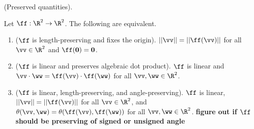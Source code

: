 \begin{theorem}
\label{ch::lin_alg::lemma::orthogonal_linear_fns_preserve_alg_dot_product}
    (Preserved quantities).

    Let $\ff:\R^2 \rightarrow \R^2$. The following are equivalent.

    \begin{enumerate}
        \item ($\ff$ is length-preserving and fixes the origin). $||\vv|| = ||\ff(\vv)||$ for all $\vv \in \R^2$ and $\ff(\mathbf{0}) = \mathbf{0}$.
        \item ($\ff$ is linear and preserves algebraic dot product). $\ff$ is linear and $\vv \cdot \ww = \ff(\vv) \cdot \ff(\ww)$ for all $\vv, \ww \in \R^2$.
        \item ($\ff$ is linear, length-preserving, and angle-preserving). $\ff$ is linear, $||\vv|| = ||\ff(\vv)||$ for all $\vv \in \R^2$, and $\theta(\vv, \ww) = \theta(\ff(\vv), \ff(\ww))$ for all $\vv, \ww \in \R^2$. 
    \textbf{figure out if $\ff$ should be preserving of signed or unsigned angle}
    \end{enumerate}
\end{theorem}

